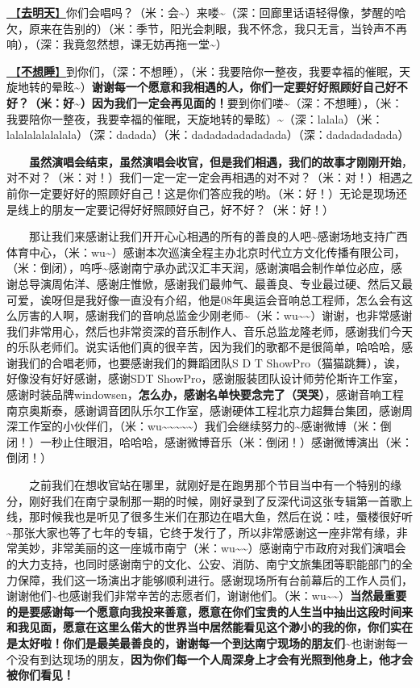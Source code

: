 \documentclass[]{ctexbook}
\begin{document}
\hyperref[go-tomorrow]{🎵【\textbf{去明天}】}你们会唱吗？（米：会\textasciitilde）来喽\textasciitilde（深：回廊里话语轻得像，梦醒的哈欠，原来在告别的）（米：季节，阳光会刺眼，我不怀念，我只无言，当铃声不再响），（深：我竟忽然想，课无妨再拖一堂\textasciitilde）

\hyperref[donot-want-to-sleep]{🎵【\textbf{不想睡}】}到你们，（深：不想睡），（米：我要陪你一整夜，我要幸福的催眠，天旋地转的晕眩\textasciitilde）\textbf{谢谢每一个愿意和我相遇的人，你们一定要好好照顾好自己好不好？（米：好\textasciitilde）因为我们一定会再见面的！}要到你们喽\textasciitilde（深：不想睡），（米：我要陪你一整夜，我要幸福的催眠，天旋地转的晕眩）\textasciitilde（深：lalala）（米：lalalalalalalala）（深：dadada）（米：dadadadadadadada）（深：dadadadadada）

  \textbf{虽然演唱会结束，虽然演唱会收官，但是我们相遇，我们的故事才刚刚开始}，对不对？（米：对！）我们一定一定一定会再相遇的对不对？（米：对！）相遇之前你一定要好好的照顾好自己！这是你们答应我的哟。（米：好！）无论是现场还是线上的朋友一定要记得好好照顾好自己，好不好？（米：好！）

  那让我们来感谢让我们开开心心相遇的所有的善良的人吧\textasciitilde 感谢场地支持广西体育中心，（米：wu\textasciitilde）感谢本次巡演全程主办北京时代立方文化传播有限公司，（米：倒闭），呜呼\textasciitilde 感谢南宁承办武汉汇丰天润，感谢演唱会制作单位必应，感谢总导演周佑洋、感谢庄惟惞，感谢我们最帅气、最善良、专业最过硬、然后又最可爱，诶呀但是我好像一直没有介绍，他是08年奥运会音响总工程师，怎么会有这么厉害的人啊，感谢我们的音响总监金少刚老师\textasciitilde（米：wu\textasciitilde\textasciitilde）谢谢，也非常感谢我们非常用心，然后也非常资深的音乐制作人、音乐总监龙隆老师，感谢我们今天的乐队老师们。说实话他们真的很辛苦，因为我们的歌都不是很简单，哈哈哈，感谢我们的合唱老师，也要感谢我们的舞蹈团队S D T ShowPro（猫猫跳舞），诶，好像没有好好感谢，感谢SDT ShowPro，感谢服装团队设计师劳伦斯许工作室，感谢时装品牌windowsen，\textbf{怎么办，感谢名单快要念完了（哭哭）}，感谢音响工程南京奥斯泰，感谢调音团队乐尔工作室，感谢硬体工程北京力超舞台集团，感谢周深工作室的小伙伴们，（米：wu\textasciitilde\textasciitilde\textasciitilde\textasciitilde\textasciitilde）我们会继续努力的\textasciitilde 感谢微博（米：倒闭！）一秒止住眼泪，哈哈哈，感谢微博音乐（米：倒闭！）感谢微博演出（米：倒闭！）

  之前我们在想收官站在哪里，就刚好是在跑男那个节目当中有一个特别的缘分，刚好我们在南宁录制那一期的时候，刚好录到了反深代词这张专辑第一首歌上线，那时候我也是听见了很多生米们在那边在唱大鱼，然后在说：哇，蜃楼很好听\textasciitilde 那张大家也等了七年的专辑，它终于发行了，所以非常感谢这一座非常有缘，非常美妙，非常美丽的这一座城市南宁（米：wu\textasciitilde\textasciitilde）感谢南宁市政府对我们演唱会的大力支持，也同时感谢南宁的文化、公安、消防、南宁文旅集团等职能部门的全力保障，我们这一场演出才能够顺利进行。感谢现场所有台前幕后的工作人员们，谢谢他们\textasciitilde 也感谢我们非常辛苦的志愿者们，谢谢他们。（米：wu\textasciitilde\textasciitilde）\textbf{当然最重要的是要感谢每一个愿意向我投来善意，愿意在你们宝贵的人生当中抽出这段时间来和我见面，愿意在这里么偌大的世界当中居然能看见这个渺小的我的你，你们实在是太好啦！你们是最美最善良的，谢谢每一个到达南宁现场的朋友们\textasciitilde{}}也谢谢每一个没有到达现场的朋友，\textbf{因为你们每一个人周深身上才会有光照到他身上，他才会被你们看见！}
\end{document}

